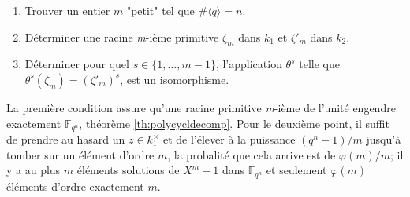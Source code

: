 \documentclass[a4paper]{article} %
\numberwithin{section}{part}
\numberwithin{equation}{section}
\newcommand\nroot[1]{\textit{#1}-ième}
\newcommand\GF[1]{\mathbb{F}_{#1}}
\newcommand\groupgen[1]{\langle{#1}\rangle}
\begin{document}
\vspace{0.3cm}
\begin{enumerate}[1.]
    \item Trouver un entier $m$ "petit" tel que $\#\groupgen{q} = n$. 

    \item Déterminer une racine \nroot{m} primitive $\zeta_m$ dans $k_1$ et
    $\zeta'_m$ dans $k_2$.

    \item  Déterminer pour quel $s\in \lbrace{1,\dots,m-1}\rbrace$, 
    l'application $\theta^s$ telle que $\theta^s(\zeta_m) = (\zeta'_m)^s$, est 
	un isomorphisme.
\end{enumerate}
\vspace{0.3cm}
La première condition assure qu'une racine primitive \nroot{m} de l'unité 
engendre exactement $\GF{q^n}$, théorème \ref{th:polycycldecomp}. Pour le 
deuxième point, il suffit de prendre au hasard un $z\in k_1^{\times}$ et de 
l'élever à la puissance $(q^n - 1)/m$ jusqu'à tomber sur un élément d'ordre $m$,
la probalité que cela arrive est de $\varphi(m)/m$; il y a au plus $m$ éléments 
solutions de $X^m - 1$ dans $\GF{q^n}$ et seulement $\varphi(m)$ éléments 
d'ordre exactement $m$.
\end{document}
